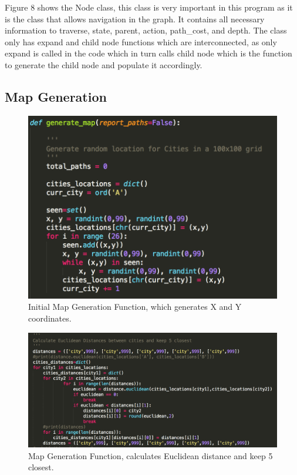 \documentclass[12pt, letter]{article}
\begin{document}
Figure 8 shows the Node class, this class is very important in this program as it is the class that allows navigation in the graph. It contains all necessary information to traverse, state, parent, action, path\_cost, and depth. The class only has expand and child node functions which are interconnected, as only expand is called in the code which in turn calls child node which is the function to generate the child node and populate it accordingly. 

\FloatBarrier

\subsection{Map Generation}

\begin{figure}[htb]
  \centering
  \includegraphics[width=0.9 \textwidth]{./graphs/generate_map_1.png}
  \caption{Initial Map Generation Function, which generates X and Y coordinates.}
\end{figure}

\begin{figure}[htb]
  \centering
  \includegraphics[width=0.9 \textwidth]{./graphs/generate_map_2.png}
  \caption{Map Generation Function, calculates Euclidean distance and keep 5 closest.}
\end{figure}
\end{document}
